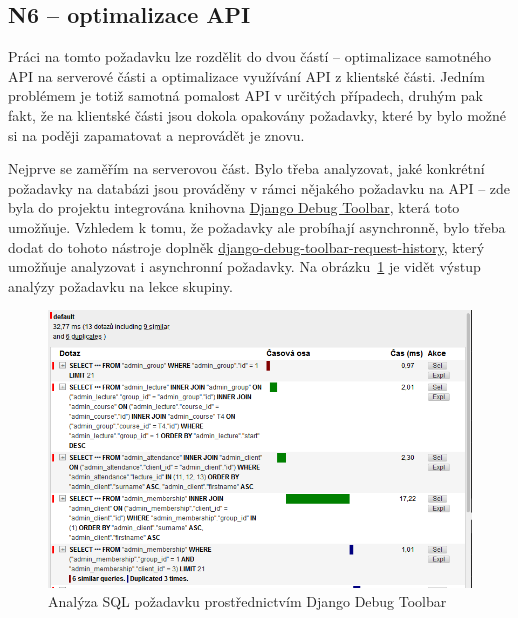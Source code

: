 \subsection{N6 -- optimalizace API}\label{subsec:N6implementace}

Práci na tomto požadavku lze rozdělit do dvou částí -- optimalizace samotného API na serverové části a optimalizace využívání API z klientské části. Jedním problémem je totiž samotná pomalost API v určitých případech, druhým pak fakt, že na klientské části jsou dokola opakovány požadavky, které by bylo možné si na poději zapamatovat a neprovádět je znovu.

Nejprve se zaměřím na serverovou část. Bylo třeba analyzovat, jaké konkrétní požadavky na databázi jsou prováděny v rámci nějakého požadavku na API -- zde byla do projektu integrována knihovna \href{https://django-debug-toolbar.readthedocs.io/en/latest/}{Django Debug Toolbar}, která toto umožňuje. Vzhledem k tomu, že požadavky ale probíhají asynchronně, bylo třeba dodat do tohoto nástroje doplněk \href{https://github.com/djsutho/django-debug-toolbar-request-history}{django-debug-toolbar-request-history}, který umožňuje analyzovat i asynchronní požadavky. Na obrázku~\ref{fig:ddt} je vidět výstup analýzy požadavku na lekce skupiny.

\begin{figure}[h]\centering
    \includegraphics[width=1\textwidth]{img/ddt.png}
    \caption{Analýza SQL požadavku prostřednictvím Django Debug Toolbar}\label{fig:ddt}
\end{figure}


